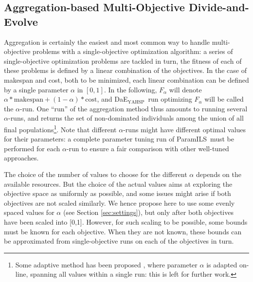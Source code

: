 \documentclass{llncs}
\newcommand{\DAEYAHSP}{{\sc DaE$_{\text{YAHSP}}$}}
\def\PARAMILS{{\sc ParamILS}}
\begin{document}
\subsection{Aggregation-based Multi-Objective Divide-and-Evolve}
\label{sec:aggregation}
Aggregation is certainly the easiest and most common way to handle multi-objective problems with a single-objective optimization algorithm: a series of single-objective optimization problems are tackled in turn, the fitness of each of these problems is defined by a linear combination of the objectives. In the case of makespan and cost, both to be minimized, each linear combination can be defined by a single parameter $\alpha$ in $[0,1]$. In the following, $F_{\alpha}$ will denote $\alpha * \mbox{makespan} + (1-\alpha) * \mbox{cost}$, and \DAEYAHSP\ run optimizing $F_{\alpha}$ will be called the $\alpha$-run. One ``run'' of the aggregation method thus amounts to running several $\alpha$-runs, and returns the set of non-dominated individuals among the union of all final populations\footnote{Some adaptive method has been proposed \cite{adaptiveWeightsEMO01}, where parameter $\alpha$ is adapted on-line, spanning all values within a single run: this is left for further work.}. Note that different $\alpha$-runs 
might have different optimal values for their parameters: a complete parameter tuning run of \PARAMILS\ must be performed for each $\alpha$-run to ensure a fair comparison with other well-tuned approaches.

The choice of the number of values to choose for the different $\alpha$ depends on the available resources. But the choice of the actual values aims at exploring the objective space as uniformly as possible, and some issues might arise if both objectives are not scaled similarly.
We hence propose here to use some evenly spaced values for $\alpha$ (see Section \ref{sec:settings}), but only after both objectives have been scaled into [0,1]. However, for such scaling to be possible, some bounds must be known for each objective. When they are not known, these bounds can be approximated from single-objective runs on each of the objectives in turn.
\end{document}

